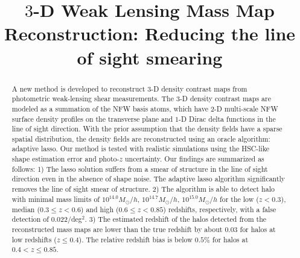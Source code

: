 \documentclass[twocolumn]{aastex62}
\begin{document}
\title{$3$-D Weak Lensing Mass Map Reconstruction:
Reducing the line of sight smearing}

\begin{abstract}
A new method is developed to reconstruct $3$-D density contrast maps from
photometric weak-lensing shear measurements. The $3$-D density contrast maps
are modeled as a summation of the NFW basis atoms, which have $2$-D multi-scale
NFW surface density profiles on the transverse plane and $1$-D Dirac delta
functions in the line of sight direction. With the prior assumption that the
density fields have a sparse spatial distribution, the density fields are
reconstructed using an oracle algorithm: adaptive lasso. Our method is tested
with realistic simulations using the HSC-like shape estimation error and
photo-$z$ uncertainty.  Our findings are summarized as follows: 1) The lasso
solution suffers from a smear of structure in the line of sight direction even
in the absence of shape noise. The adaptive lasso algorithm significantly
removes the line of sight smear of structure.  2) The algorithm is able to
detect halo with minimal mass limits of $10^{14.0} M_{\odot}/h$, $10^{14.7}
M_{\odot}/h$, $10^{15.0} M_{\odot}/h$ for the low ($z<0.3$), median ($0.3\leq
z< 0.6$) and high ($0.6\leq z< 0.85$) redshifts, respectively, with a false
detection of 0.022/deg$^2$.  3) The estimated redshift of the halos detected
from the reconstructed mass maps are lower than the true redshift by about
$0.03$ for halos at low redshifts ($z\leq 0.4$). The relative redshift bias is
below $0.5\%$ for halos at $0.4<z\leq 0.85$.
\end{abstract}
\end{document}
